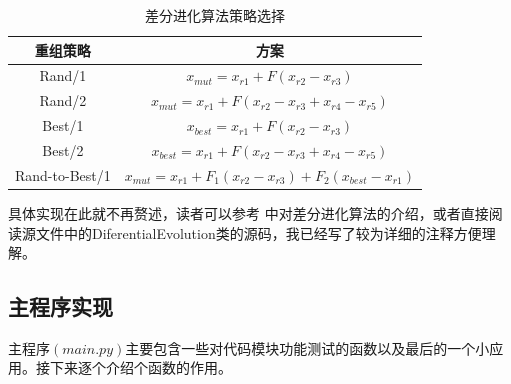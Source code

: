 \begin{table}
    \renewcommand{\arraystretch}{1.3}
        \caption{差分进化算法策略选择}
    \label{tab1}
    \centering
    \begin{tabular}{cc}
        \toprule
    重组策略& 方案\\
        \midrule
    Rand/1 & $x_{mut} = x_{r1} + F(x_{r2} - x_{r3})$  \\

    Rand/2 & $x_{mut} = x_{r1} + F(x_{r2} - x_{r3} + x_{r4} - x_{r5})$\\

    Best/1 & $x_{best} = x_{r1} + F(x_{r2} - x_{r3})$\\

    Best/2 & $x_{best} = x_{r1} + F(x_{r2} - x_{r3} + x_{r4} - x_{r5})$\\

    Rand-to-Best/1 & $x_{mut} = x_{r1} + F_1(x_{r2} - x_{r3}) + F_2(x_{best} - x_{r1})$\\
        \bottomrule
    \end{tabular}
\end{table}

具体实现在此就不再赘述，读者可以参考  中对差分进化算法的介绍，或者直接阅读源文件中的DiferentialEvolution类的源码，我已经写了较为详细的注释方便理解。

\subsection{主程序实现}

主程序$(main.py)$主要包含一些对代码模块功能测试的函数以及最后的一个小应用。接下来逐个介绍个函数的作用。

